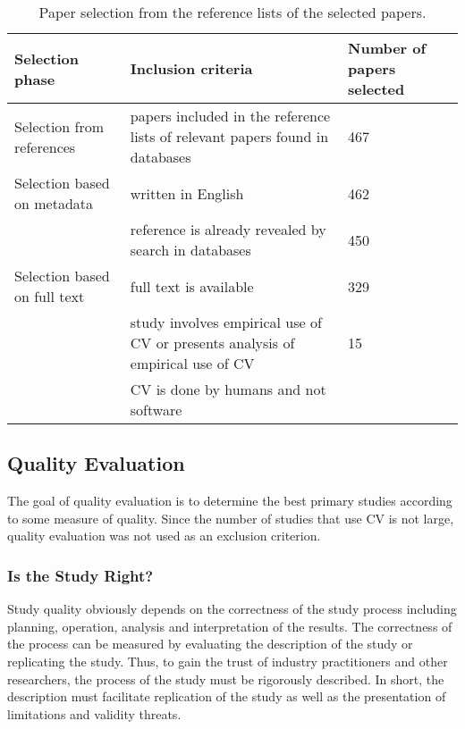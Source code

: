 %
\begin{table}
	\scriptsize
\caption{\label{tab:Paper-Selection-from}Paper selection from the reference lists of the selected papers.}

\begin{tabular}{|>{\raggedright}p{}|>{\raggedright}p{}|>{\raggedright}p{}|}
\hline 
Selection phase & Inclusion criteria & Number of papers selected\tabularnewline
\hline\hline
Selection from references & papers included in the reference lists of relevant papers found in databases & 467 \tabularnewline
\hline 


Selection based on metadata & written in English & 462 \tabularnewline
\cline{2-3}
& reference is already revealed by search in databases & 450 \tabularnewline
\hline
Selection based on full text & full text is available  & 329 \tabularnewline
\cline{2-3}
& study involves empirical use of CV or presents analysis of empirical use of CV & 15 \tabularnewline
\cline{2-2}
& CV is done by humans and not software & \tabularnewline
\hline


\end{tabular}%
\end{table}


\subsection{\label{QE}Quality Evaluation}

The goal of quality evaluation is to determine the best primary studies according to some measure of quality.
Since the number of studies that use CV is not large, quality evaluation was not used as an exclusion criterion.

\subsubsection{Is the Study Right?}

Study quality obviously depends on the correctness of the study process including planning, operation, analysis and interpretation of the results. The correctness of the process can be measured by evaluating the description of the study or replicating the study. Thus, to gain the trust of industry practitioners and other researchers, the process of the study must be rigorously described. In short, the description must facilitate replication of the study as well as the presentation of limitations and validity threats.

